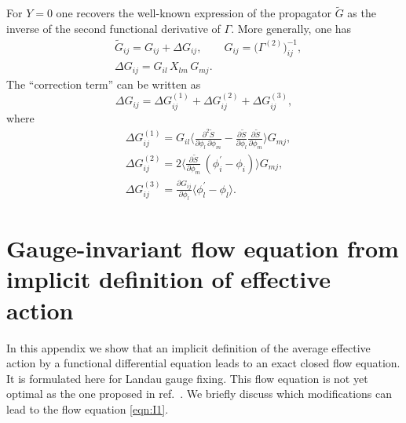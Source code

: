 \documentclass[twocolumn,aps,prd,amsmath,amssymb,preprintnumbers,longbibliography]{revtex4-1}
\numberwithin{equation}{section}
\newenvironment{alignedeqn}{\begin{equation}\begin{aligned}}{\end{aligned}\end{equation}\ignorespacesafterend}
\begin{document}
\begin{appendices}
For $Y = 0$ one recovers the well-known expression of the propagator $\tilde{G}$ as the inverse of the second functional derivative of $\Gamma$. More generally, one has
\begin{alignedeqn}\label{eqn:MN12}
	&\tilde{G}_{ij}
	= G_{ij} + \Delta G_{ij},
	\qquad
	G_{ij}
	= \bigl(\Gamma^{(2)}\bigr)_{ij}^{-1},\\
	&\Delta G_{ij}
	= G_{il} \, X_{lm} \, G_{mj}.
\end{alignedeqn}
The ``correction term'' can be written as
\begin{equation}\label{eqn:MN13}
	\Delta G_{ij}
	= \Delta G_{ij}^{(1)} + \Delta G_{ij}^{(2)} + \Delta G_{ij}^{(3)},
\end{equation}
where
\begin{alignedeqn}\label{eqn:MN14}
	&\Delta G_{ij}^{(1)}
	= G_{il} \biggl\langle\frac{\partial^2 \tilde{S}}{\partial \phi_l \, \partial \phi_m} - \frac{\partial \tilde{S}}{\partial \phi_l} \frac{\partial \tilde{S}}{\partial \phi_m}\biggr\rangle G_{mj},\\
	&\Delta G_{ij}^{(2)}
	= 2 \biggl\langle\frac{\partial \tilde{S}}{\partial \phi_m} \, (\phi_i^\prime - \phi_i)\biggr\rangle G_{mj},\\
	&\Delta G_{ij}^{(3)}
	= \frac{\partial G_{ij}}{\partial \phi_l} \langle\phi_l^\prime - \phi_l\rangle.
\end{alignedeqn}



\section{Gauge-invariant flow equation from implicit definition of effective action}
\label{app:gauge-invariance flow}

In this appendix we show that an implicit definition of the average effective action by a functional differential equation leads to an exact closed flow equation. It is formulated here for Landau gauge fixing. This flow equation is not yet optimal as the one proposed in ref.~\cite{CWGIF}. We briefly discuss which modifications can lead to the flow equation \eqref{eqn:I1}.


\end{appendices}
\end{document}
